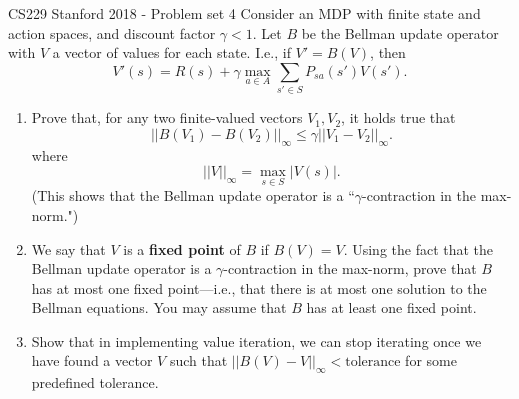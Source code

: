 \begin{problem}{}{}{CS229 Stanford 2018 - Problem set 4}
Consider an MDP with finite state and action spaces, and discount factor
$\gamma < 1$. Let $B$ be the Bellman update operator with $V$ a vector of
values for each state. I.e., if $V' = B(V)$, then
$$
    V'(s) = R(s) + \gamma \max_{a \in A} \sum_{s' \in S} P_{sa}(s')V(s').
$$

\begin{enumerate}
    \item[(a)] Prove that, for any two finite-valued vectors
          $V_1, V_2$, it holds true that
          $$
              ||B(V_1) - B(V_2)||_\infty \le \gamma ||V_1 - V_2||_\infty.
          $$
          where
          $$
              ||V||_\infty = \max_{s \in S} |V(s)|.
          $$
          (This shows that the Bellman update operator is a ``$\gamma$-contraction
          in the max-norm.")

    \item[(b)] We say that $V$ is a \textbf{fixed point} of $B$
          if $B(V) = V$. Using the fact that the Bellman update operator is a
          $\gamma$-contraction in the max-norm, prove that $B$ has at most
          one fixed point---i.e., that there is at most one solution to the
          Bellman equations. You may assume that $B$ has at least one fixed point.

    \item[(c)]
          Show that in implementing value iteration, we can stop iterating once we have found a vector
          $V$ such that $||B(V) - V||_\infty < \text{tolerance}$ for some predefined tolerance.
\end{enumerate}
\end{problem}

